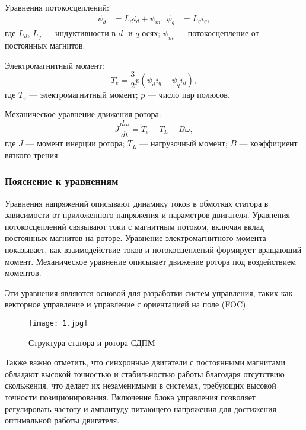 \documentclass[a4paper,14pt]{extarticle} %
\begin{document}
Уравнения потокосцеплений:
\begin{equation}
\begin{aligned}
\psi_d &= L_d i_d + \psi_m, \
\psi_q &= L_q i_q,
\end{aligned}
\end{equation}
где $L_d$, $L_q$ — индуктивности в $d$- и $q$-осях; $\psi_m$ — потокосцепление от постоянных магнитов.

Электромагнитный момент:
\begin{equation}
T_e = \frac{3}{2} p \left(\psi_d i_q - \psi_q i_d\right),
\end{equation}
где $T_e$ — электромагнитный момент; $p$ — число пар полюсов.

Механическое уравнение движения ротора:
\begin{equation}
J\frac{d\omega}{dt} = T_e - T_L - B\omega,
\end{equation}
где $J$ — момент инерции ротора; $T_L$ — нагрузочный момент; $B$ — коэффициент вязкого трения.

\subsubsection*{Пояснение к уравнениям}

Уравнения напряжений описывают динамику токов в обмотках статора в зависимости от приложенного напряжения и параметров двигателя. Уравнения потокосцеплений связывают токи с магнитным потоком, включая вклад постоянных магнитов на роторе. Уравнение электромагнитного момента показывает, как взаимодействие токов и потокосцеплений формирует вращающий момент. Механическое уравнение описывает движение ротора под воздействием моментов.

Эти уравнения являются основой для разработки систем управления, таких как векторное управление и управление с ориентацией на поле (FOC).

\begin{figure}[h]
    \centering
    \texttt{[image: 1.jpg]}
    \caption{Структура статора и ротора СДПМ}
    \label{fig:mpr}
\end{figure}

Также важно отметить, что синхронные двигатели с постоянными магнитами обладают высокой точностью и стабильностью работы благодаря отсутствию скольжения, что делает их незаменимыми в системах, требующих высокой точности позиционирования. Включение блока управления позволяет регулировать частоту и амплитуду питающего напряжения для достижения оптимальной работы двигателя.
\end{document}
